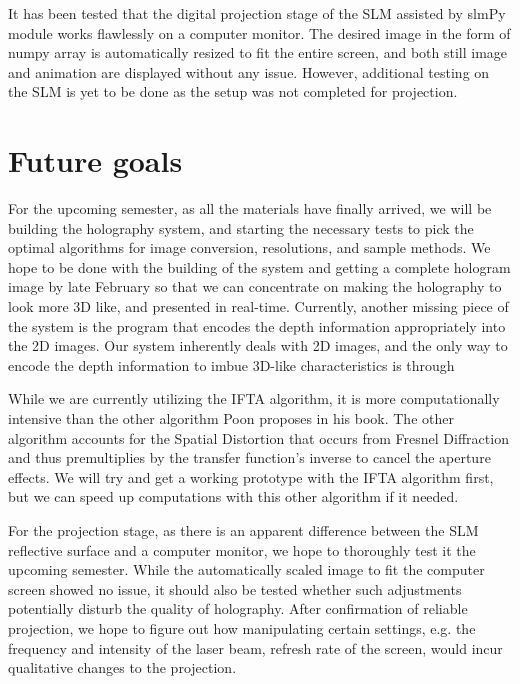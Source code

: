 \documentclass[12pt]{article}
\begin{document}
It has been tested that the digital projection stage of the SLM assisted by slmPy module works flawlessly on a computer monitor. The desired image in the form of numpy array is automatically resized to fit the entire screen, and both still image and animation are displayed without any issue. However, additional testing on the SLM is yet to be done as the setup was not completed for projection. 

\section{Future goals}
For the upcoming semester, as all the materials have finally arrived, we will be building the holography system, and starting the necessary tests to pick the optimal algorithms for image conversion, resolutions, and sample methods. We hope to be done with the building of the system and getting a complete hologram image by late February so that we can concentrate on making the holography to look more 3D like, and presented in real-time. Currently, another missing piece of the system is the program that encodes the depth information appropriately into the 2D images. Our system inherently deals with 2D images, and the only way to encode the depth information to imbue 3D-like characteristics is through 

While we are currently utilizing the IFTA algorithm, it is more computationally intensive than the other algorithm Poon proposes in his book. The other algorithm accounts for the Spatial Distortion that occurs from Fresnel Diffraction and thus premultiplies by the transfer function's inverse to cancel the aperture effects. We will try and get a working prototype with the IFTA algorithm first, but we can speed up computations with this other algorithm if it needed.

For the projection stage, as there is an apparent difference between the SLM reflective surface and a computer monitor, we hope to thoroughly test it the upcoming semester. While the automatically scaled image to fit the computer screen showed no issue, it should also be tested whether such adjustments potentially disturb the quality of holography. After confirmation of reliable projection, we hope to figure out how manipulating certain settings, e.g. the frequency and intensity of the laser beam, refresh rate of the screen, would incur qualitative changes to the projection. 



\end{document}
